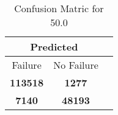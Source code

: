 \begin{table}[] 
\caption{Confusion Matric for 50.0} 
\label{Table: Prediction Accuracy-DMD50.0OnlySunEKF-combinationReflectionEKF-top2perfectNoFailurePrediction-Reflection} 
\centering 
\begin{tabular} 
 {@{}ccc@{}} 
\toprule 
\multicolumn{2}{c}{\textbf{Predicted}}
 \\ \midrule 
\multicolumn{1}{|c|}{Failure} & 
\multicolumn{1}{c|}{No Failure}
 \\ \midrule 
\multicolumn{1}{|c|}{\color{green}\textbf{113518}} & 
\multicolumn{1}{c|}{\color{red}\textbf{1277}}
 \\ \midrule 
\multicolumn{1}{|c|}{\color{red}\textbf{7140}} & 
\multicolumn{1}{c|}{\color{green}\textbf{48193}}
 \\ \bottomrule 
\end{tabular} 
\end{table} 
